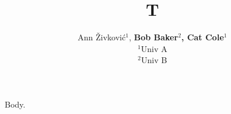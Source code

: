 \documentclass{article}
\author{Ann \v{Z}ivkovi\'c$^{1}$, \textbf{Bob Baker$^{2}$, Cat Cole$^{1}$}\\ $^{1}$Univ A\\ $^{2}$Univ B}
\title{T}
\begin{document}
\maketitle
Body.
\end{document}
